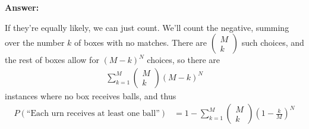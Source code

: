 \documentclass{article}
\begin{document}
\textbf{Answer: }

If they're equally likely, we can just count. We'll count the negative, summing over the number $k$ of boxes with no matches. There are $\begin{pmatrix}M\\k\end{pmatrix}$ such choices, and the rest of boxes allow for $(M-k)^N$ choices, so there are
\begin{align}
	\sum_{k=1}^M\begin{pmatrix}M\\k\end{pmatrix}(M-k)^N
\end{align}
instances where no box receives balls, and thus
\begin{align}
	P(\text{``Each urn receives at least one ball''})&=1-\sum_{k=1}^M\begin{pmatrix}M\\k\end{pmatrix}\left(1-\frac{k}{M}\right)^N
\end{align}
\end{document}
